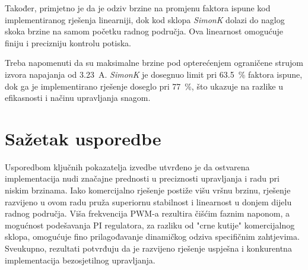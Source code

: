 \documentclass[diplomskirad]{fer}
\begin{document}
Također, primjetno je da je odziv brzine na promjenu faktora ispune kod
implementiranog rješenja linearniji, dok kod sklopa \textit{SimonK} dolazi do
naglog skoka brzine na samom početku radnog područja. Ova linearnost omogućuje
finiju i precizniju kontrolu potiska.

Treba napomenuti da su maksimalne brzine pod opterećenjem ograničene strujom
izvora napajanja od \SI{3.23}{\ampere}. \textit{SimonK} je dosegnuo limit pri
\SI{63.5}{\%} faktora ispune, dok ga je implementirano rješenje doseglo pri
\SI{77}{\%}, što ukazuje na razlike u efikasnosti i načinu upravljanja snagom.

\section{Sažetak usporedbe}
\label{sec:sazetak_usporedbe}

Usporedbom ključnih pokazatelja izvedbe utvrđeno je da ostvarena implementacija
nudi značajne prednosti u preciznosti upravljanja i radu pri niskim brzinama.
Iako komercijalno rješenje postiže višu vršnu brzinu, rješenje razvijeno u ovom
radu pruža superiornu stabilnost i linearnost u donjem dijelu radnog područja.
Viša frekvencija PWM-a rezultira čišćim faznim naponom, a mogućnost podešavanja
PI regulatora, za razliku od "crne kutije" komercijalnog sklopa, omogućuje fino
prilagođavanje dinamičkog odziva specifičnim zahtjevima. Sveukupno, rezultati
potvrđuju da je razvijeno rješenje uspješna i konkurentna implementacija
bezosjetilnog upravljanja.


%


%

\end{document}
